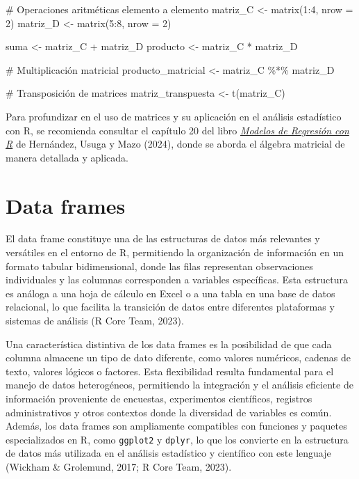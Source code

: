 \documentclass[
  spanish,
  a4paper,
  DIV=11,
  numbers=noendperiod,
  onepage,
  openany]{scrreprt}
\newenvironment{Shaded}{\begin{snugshade}}{\end{snugshade}}
\newcommand{\AttributeTok}[1]{\textcolor[rgb]{0.40,0.45,0.13}{#1}}
\newcommand{\CommentTok}[1]{\textcolor[rgb]{0.37,0.37,0.37}{#1}}
\newcommand{\DecValTok}[1]{\textcolor[rgb]{0.68,0.00,0.00}{#1}}
\newcommand{\FunctionTok}[1]{\textcolor[rgb]{0.28,0.35,0.67}{#1}}
\newcommand{\NormalTok}[1]{\textcolor[rgb]{0.00,0.23,0.31}{#1}}
\newcommand{\OtherTok}[1]{\textcolor[rgb]{0.00,0.23,0.31}{#1}}
\newcommand{\SpecialCharTok}[1]{\textcolor[rgb]{0.37,0.37,0.37}{#1}}
\begin{document}
\begin{Shaded}
\begin{Highlighting}[]
\CommentTok{\# Operaciones aritméticas elemento a elemento}
\NormalTok{matriz\_C }\OtherTok{\textless{}{-}} \FunctionTok{matrix}\NormalTok{(}\DecValTok{1}\SpecialCharTok{:}\DecValTok{4}\NormalTok{, }\AttributeTok{nrow =} \DecValTok{2}\NormalTok{)}
\NormalTok{matriz\_D }\OtherTok{\textless{}{-}} \FunctionTok{matrix}\NormalTok{(}\DecValTok{5}\SpecialCharTok{:}\DecValTok{8}\NormalTok{, }\AttributeTok{nrow =} \DecValTok{2}\NormalTok{)}

\NormalTok{suma }\OtherTok{\textless{}{-}}\NormalTok{ matriz\_C }\SpecialCharTok{+}\NormalTok{ matriz\_D}
\NormalTok{producto }\OtherTok{\textless{}{-}}\NormalTok{ matriz\_C }\SpecialCharTok{*}\NormalTok{ matriz\_D}

\CommentTok{\# Multiplicación matricial}
\NormalTok{producto\_matricial }\OtherTok{\textless{}{-}}\NormalTok{ matriz\_C }\SpecialCharTok{\%*\%}\NormalTok{ matriz\_D}

\CommentTok{\# Transposición de matrices}
\NormalTok{matriz\_transpuesta }\OtherTok{\textless{}{-}} \FunctionTok{t}\NormalTok{(matriz\_C)}
\end{Highlighting}
\end{Shaded}

Para profundizar en el uso de matrices y su aplicación en el análisis
estadístico con R, se recomienda consultar el capítulo 20 del libro
\href{https://fhernanb.github.io/libro_regresion/algmat.html}{\emph{Modelos
de Regresión con R}} de Hernández, Usuga y Mazo (2024), donde se aborda
el álgebra matricial de manera detallada y aplicada.

\section{Data frames}\label{data-frames}

El data frame constituye una de las estructuras de datos más relevantes
y versátiles en el entorno de R, permitiendo la organización de
información en un formato tabular bidimensional, donde las filas
representan observaciones individuales y las columnas corresponden a
variables específicas. Esta estructura es análoga a una hoja de cálculo
en Excel o a una tabla en una base de datos relacional, lo que facilita
la transición de datos entre diferentes plataformas y sistemas de
análisis (R Core Team, 2023).

Una característica distintiva de los data frames es la posibilidad de
que cada columna almacene un tipo de dato diferente, como valores
numéricos, cadenas de texto, valores lógicos o factores. Esta
flexibilidad resulta fundamental para el manejo de datos heterogéneos,
permitiendo la integración y el análisis eficiente de información
proveniente de encuestas, experimentos científicos, registros
administrativos y otros contextos donde la diversidad de variables es
común. Además, los data frames son ampliamente compatibles con funciones
y paquetes especializados en R, como \texttt{ggplot2} y \texttt{dplyr},
lo que los convierte en la estructura de datos más utilizada en el
análisis estadístico y científico con este lenguaje (Wickham \&
Grolemund, 2017; R Core Team, 2023).
\end{document}
